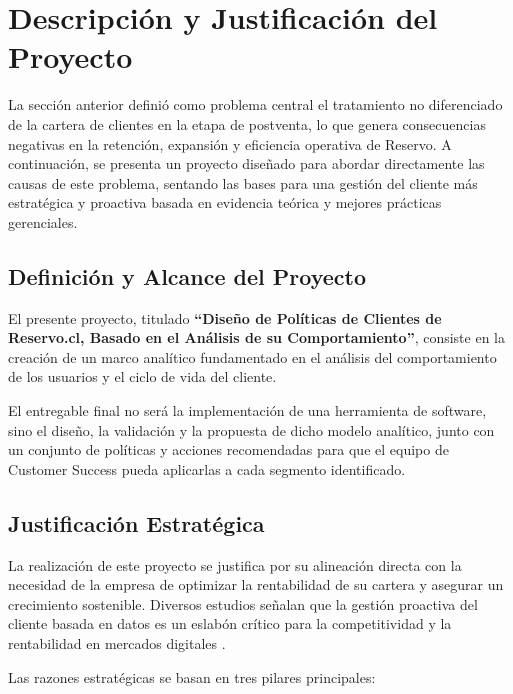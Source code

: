 \section{Descripción y Justificación del Proyecto}

La sección anterior definió como problema central el tratamiento no diferenciado de la cartera de clientes en la etapa de postventa, lo que genera consecuencias negativas en la retención, expansión y eficiencia operativa de Reservo. A continuación, se presenta un proyecto diseñado para abordar directamente las causas de este problema, sentando las bases para una gestión del cliente más estratégica y proactiva basada en evidencia teórica y mejores prácticas gerenciales.

\subsection{Definición y Alcance del Proyecto}

El presente proyecto, titulado \textbf{“Diseño de Políticas de Clientes de Reservo.cl, Basado en el Análisis de su Comportamiento”}, consiste en la creación de un marco analítico fundamentado en el análisis del comportamiento de los usuarios y el ciclo de vida del cliente.  

El entregable final no será la implementación de una herramienta de software, sino el diseño, la validación y la propuesta de dicho modelo analítico, junto con un conjunto de políticas y acciones recomendadas para que el equipo de Customer Success pueda aplicarlas a cada segmento identificado.

\subsection{Justificación Estratégica}

La realización de este proyecto se justifica por su alineación directa con la necesidad de la empresa de optimizar la rentabilidad de su cartera y asegurar un crecimiento sostenible. Diversos estudios señalan que la gestión proactiva del cliente basada en datos es un eslabón crítico para la competitividad y la rentabilidad en mercados digitales \citep{Reinartz2004}.

Las razones estratégicas se basan en tres pilares principales:  

